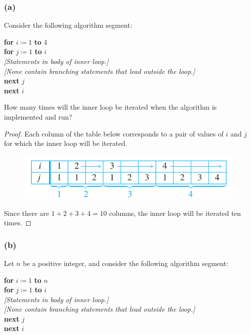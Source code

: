 \documentclass[14pt]{extarticle}
\begin{document}
\subsubsection{(a)}
Consider the following algorithm segment:

\begin{tabbing}
{\bf for} \= \(i \coloneqq 1\) {\bf to} 4 \\
          \> {\bf for} \= \(j \coloneqq 1\) {\bf to} $i$ \\
          \>           \> {\it [Statements in body of inner loop.]} \\
          \>           \> {\it [None contain branching statements that lead outside the loop.]} \\
          \> {\bf next} $j$ \\
{\bf next} $i$
\end{tabbing}

How many times will the inner loop be iterated when the algorithm is implemented and run?

\begin{proof}
Each column of the table below corresponds to a pair of values of $i$ and $j$ for which the inner loop will be iterated.

\begin{figure}[ht!]
\centering
\includegraphics[scale=0.5]{../images/9.3.9.a.png}
\end{figure}

Since there are \(1 + 2 + 3 + 4 = 10\) columns, the inner loop will be iterated ten times.
\end{proof}

\subsubsection{(b)}
Let $n$ be a positive integer, and consider the following algorithm segment:

\begin{tabbing}
{\bf for} \= \(i \coloneqq 1\) {\bf to} $n$ \\
          \> {\bf for} \= \(j \coloneqq 1\) {\bf to} $i$ \\
          \>           \> {\it [Statements in body of inner loop.]} \\
          \>           \> {\it [None contain branching statements that lead outside the loop.]} \\
          \> {\bf next} $j$ \\
{\bf next} $i$
\end{tabbing}
\end{document}
